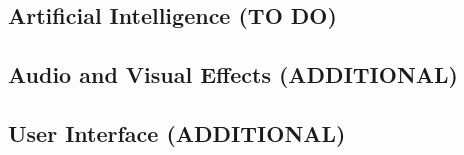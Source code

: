 




\subsection{Artificial Intelligence (TO DO)}








\subsection{Audio and Visual Effects (ADDITIONAL)}


\subsection{User Interface (ADDITIONAL)}

